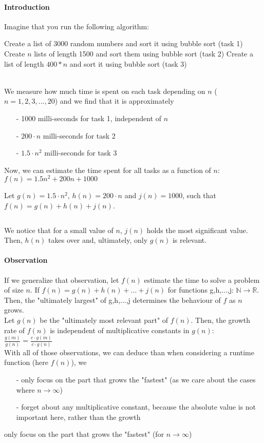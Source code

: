 \documentclass[10pt,a4paper]{book}
\newcommand{\R}{\mathbb{R}}
\newcommand{\N}{\mathbb{N}}
\newcommand{\ind}{\hspace*{\parindent}}
\begin{document}
\paragraph*{Introduction}
Imagine that you run the following algorithm:
\begin{algorithm}
\DontPrintSemicolon
Create a list of 3000 random numbers and sort it using bubble sort (task 1)\;
Create $n$ lists of length 1500 and sort them using bubble sort (task 2)\;
Create a list of length $400*n$ and sort it using bubble sort (task 3)
\caption{$Sort\_tasks(n: integer)$}
\end{algorithm}\\
\ind We measure how much time is spent on each task depending on $n$ ($n = 1,2,3,...,20$) and we find that it is approximately
\begin{itemize}
\item[-]1000 milli-seconds for task 1, independent of $n$
\item[-]$200\cdot n$ milli-seconds for task 2
\item[-]$1.5\cdot n^2$ milli-seconds for task 3
\end{itemize}
\ind Now, we can estimate the time spent for all tasks as a function of $n$: $f(n)=1.5n^{2}+200n+1000$\par
Let $g(n)=1.5\cdot n^2$, $h(n)=200\cdot n$ and $j(n)=1000$, such that $f(n)=g(n)+h(n)+j(n)$.\par
$\ $\par
We notice that for a small value of $n$, $j(n)$ holds the most significant value. Then, $h(n)$ takes over and, ultimately, only $g(n)$ is relevant.
\paragraph*{Observation}
\ind If we generalize that observation, let $f(n)$ estimate the time to solve a problem of size $n$. If $f(n)=g(n)+h(n)+...+j(n)$ for functions g,h,...,j: $\N \to \R$. Then, the "ultimately largest" of g,h,...,j determines the behaviour of $f$ as $n$ grows.\\
\ind Let $g(n)$ be the "ultimately most relevant part" of $f(n)$. Then, the growth rate of $f(n)$ is independent of multiplicative constants in $g(n)$:
$\frac{g(m)}{g(n)}=\frac{c\cdot g(m)}{c\cdot g(n)}$\\
\ind With all of those observations, we can deduce than when considering a runtime function (here $f(n)$), we 
\begin{itemize}
\item[-]only focus on the part that grows the "fastest" (as we care about the cases where $n \to \infty$)
\item[-]forget about any multiplicative constant, because the absolute value is not important here, rather than the growth
\end{itemize}
only focus on the part that grows the "fastest" (for $n \to \infty$)
\end{document}

